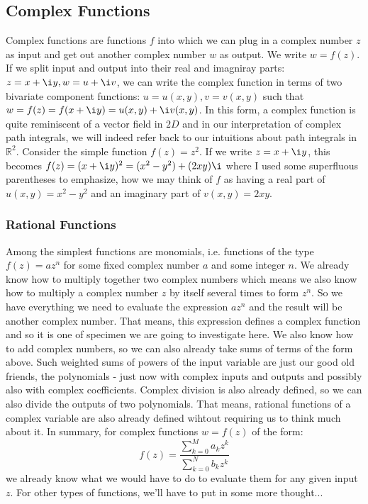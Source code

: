 \subsection{Complex Functions}
Complex functions are functions $f$ into which we can plug in a complex number $z$ as input and get out another complex number $w$ as output. We write $w = f(z)$. If we split input and output into their real and imagniray parts: $z = x + \i y, w = u  + \i v$, we can write the complex function in terms of two bivariate component functions: $u = u(x,y), v = v(x,y)$ such that $w = f(z) = f(x + \i y) = u(x,y) + \i v(x,y)$. In this form, a complex function is quite reminiscent of a vector field in $2D$ and in our interpretation of complex path integrals, we will indeed refer back to our intuitions about path integrals in $\mathbb{R}^2$. Consider the simple function $f(z) = z^2$. If we write $z = x + \i y$, this becomes $f(z) = (x + \i y)^2 = (x^2 - y^2) + (2 x y ) \i$ where I used some superfluous parentheses to emphasize, how we may think of $f$ as having a real part of $u(x,y) = x^2 - y^2$ and an imaginary part of $v(x,y) = 2 x y$.


\subsubsection{Rational Functions}
Among the simplest functions are monomials, i.e. functions of the type $f(z) = a z^n$ for some fixed complex number $a$ and some integer $n$. We already know how to multiply together two complex numbers which means we also know how to multiply a complex number $z$ by itself several times to form $z^n$. So we have everything we need to evaluate the expression $a z^n$ and the result will be another complex number. That means, this expression defines a complex function and so it is one of specimen we are going to investigate here. We also know how to add complex numbers, so we can also already take sums of terms of the form above. Such weighted sums of powers of the input variable are just our good old friends, the polynomials - just now with complex inputs and outputs and possibly also with complex coefficients. Complex division is also already defined, so we can also divide the outputs of two polynomials. That means, rational functions of a complex variable are also already defined wihtout requiring us to think much about it. In summary, for complex functions $w = f(z)$ of the form:
\begin{equation}
f(z) = \frac{\sum_{k=0}^{M} a_k z^k}{\sum_{k=0}^{N} b_k z^k}
\end{equation}
we already know what we would have to do to evaluate them for any given input $z$. For other types of functions, we'll have to put in some more thought...


